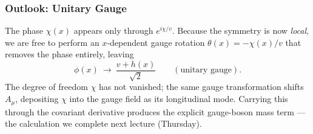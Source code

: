 \subsubsection*{Outlook: Unitary Gauge}

The phase $\chi(x)$ appears only through $e^{i\chi/v}$. Because the symmetry is now \emph{local}, we are free to perform an $x$-dependent gauge rotation $\theta(x)=-\chi(x)/v$ that removes the phase entirely, leaving
\begin{equation}
  \phi(x)\ \longrightarrow\ \frac{v+h(x)}{\sqrt2}\qquad(\text{unitary gauge}).
  \label{eq:lec16:unitary_gauge_preview}
\end{equation}
The degree of freedom $\chi$ has not vanished; the same gauge transformation shifts $A_\mu$, depositing $\chi$ into the gauge field as its longitudinal mode. Carrying this through the covariant derivative produces the explicit gauge-boson mass term --- the calculation we complete next lecture (Thursday).

